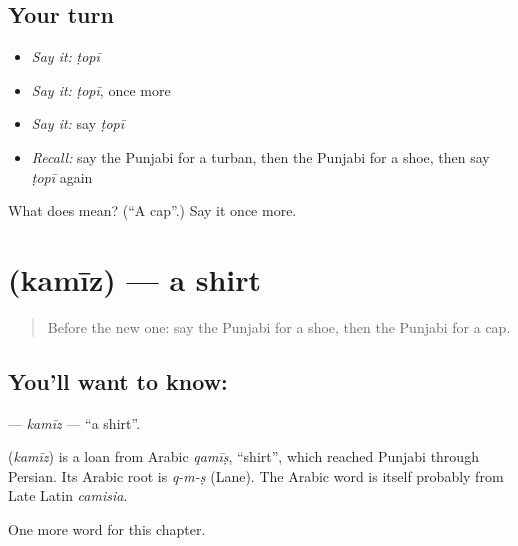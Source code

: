 \subsection*{Your turn}
\begin{itemize}
\raggedright
  \item \emph{Say it:} \emph{ṭopī}
  \item \emph{Say it:} \emph{ṭopī}, once more
  \item \emph{Say it:} say \emph{ṭopī}
  \item \emph{Recall:} say the Punjabi for a turban, then the Punjabi for a shoe, then say \emph{ṭopī} again
\end{itemize}

\begin{tcolorbox}[breakable,colback=teal!4,colframe=teal!35!black,title={Before you move on}]
What does  mean? (\textquotedblleft{}A cap\textquotedblright{}.) Say it once more.
\end{tcolorbox}
\section[\texorpdfstring{\pa{ਕਮੀਜ਼} (kamīz)}{ਕਮੀਜ਼ (kamīz)}]{ (kamīz) — a shirt}

\label{lesson:PA-C94-kamiz}



\begin{quote}
Before the new one: say the Punjabi for a shoe, then the Punjabi for a cap.
\end{quote}

\subsection*{You'll want to know: }
\textbf{} — \emph{kamīz} — \textquotedblleft{}a shirt\textquotedblright{}.

\begin{cousinweb}
\textbf{} (\emph{kamīz}) is a loan from Arabic \emph{qamīṣ}, \textquotedblleft{}shirt\textquotedblright{}, which reached Punjabi through Persian. Its Arabic root is \emph{q-m-ṣ} (Lane). The Arabic word is itself probably from Late Latin \emph{camisia}.
\end{cousinweb}

\begin{grammarlens}[title={What you've built}]
One more word for this chapter.
\end{grammarlens}


